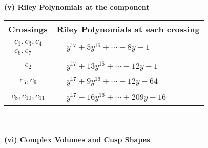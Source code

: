 \documentclass[1p]{elsarticle_modified}
\theoremstyle{definition}
\begin{document}
\newpage\renewcommand{\arraystretch}{1}
\flushleft \textbf{(v) Riley Polynomials at the component}\newline \\
\begin{tabular}{m{50pt}|m{274pt}}
Crossings & \hspace{64pt}Riley Polynomials at each crossing \\
\hline $$\begin{aligned}c_{1},c_{3},c_{4}\\c_{6},c_{7}\end{aligned}$$&$\begin{aligned}
&y^{17}+5 y^{16}+\cdots-8 y-1
\end{aligned}$\\
\hline $$\begin{aligned}c_{2}\end{aligned}$$&$\begin{aligned}
&y^{17}+13 y^{16}+\cdots-12 y-1
\end{aligned}$\\
\hline $$\begin{aligned}c_{5},c_{9}\end{aligned}$$&$\begin{aligned}
&y^{17}+9 y^{16}+\cdots-12 y-64
\end{aligned}$\\
\hline $$\begin{aligned}c_{8},c_{10},c_{11}\end{aligned}$$&$\begin{aligned}
&y^{17}-16 y^{16}+\cdots+209 y-16
\end{aligned}$\\
\hline
\end{tabular}\\~\\
\newpage\flushleft \textbf{(vi) Complex Volumes and Cusp Shapes}
\end{document}

